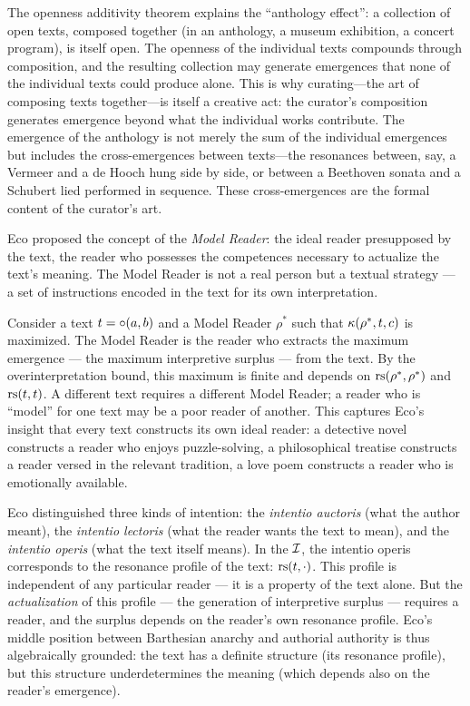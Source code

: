 \begin{interpretation}
The openness additivity theorem explains the ``anthology effect'': a collection of open texts, composed together (in an anthology, a museum exhibition, a concert program), is itself open. The openness of the individual texts compounds through composition, and the resulting collection may generate emergences that none of the individual texts could produce alone. This is why curating---the art of composing texts together---is itself a creative act: the curator's composition generates emergence beyond what the individual works contribute. The emergence of the anthology is not merely the sum of the individual emergences but includes the cross-emergences between texts---the resonances between, say, a Vermeer and a de Hooch hung side by side, or between a Beethoven sonata and a Schubert lied performed in sequence. These cross-emergences are the formal content of the curator's art.
\end{interpretation}

Eco proposed the concept of the \emph{Model Reader}: the ideal reader
presupposed by the text, the reader who possesses the competences
necessary to actualize the text's meaning. The Model Reader is not a
real person but a textual strategy --- a set of instructions encoded in
the text for its own interpretation.

\begin{example}
Consider a text $t = \circ(a, b)$ and a Model Reader $\rho^*$ such
that $\kappa(\rho^*, t, c)$ is maximized. The Model Reader is the
reader who extracts the maximum emergence --- the maximum interpretive
surplus --- from the text. By the overinterpretation bound, this
maximum is finite and depends on $\mathrm{rs}(\rho^*, \rho^*)$ and $\mathrm{rs}(t, t)$.
A different text requires a different Model Reader; a reader who is
``model'' for one text may be a poor reader of another. This captures
Eco's insight that every text constructs its own ideal reader: a
detective novel constructs a reader who enjoys puzzle-solving, a
philosophical treatise constructs a reader versed in the relevant
tradition, a love poem constructs a reader who is emotionally
available.
\end{example}

\begin{remark}
Eco distinguished three kinds of intention: the \emph{intentio auctoris}
(what the author meant), the \emph{intentio lectoris} (what the reader
wants the text to mean), and the \emph{intentio operis} (what the text
itself means). In the $\mathcal{I}$, the intentio operis corresponds to the
resonance profile of the text: $\mathrm{rs}(t, \cdot)$. This profile is
independent of any particular reader --- it is a property of the text
alone. But the \emph{actualization} of this profile --- the generation
of interpretive surplus --- requires a reader, and the surplus depends
on the reader's own resonance profile. Eco's middle position between
Barthesian anarchy and authorial authority is thus algebraically
grounded: the text has a definite structure (its resonance profile),
but this structure underdetermines the meaning (which depends also on
the reader's emergence).
\end{remark}

